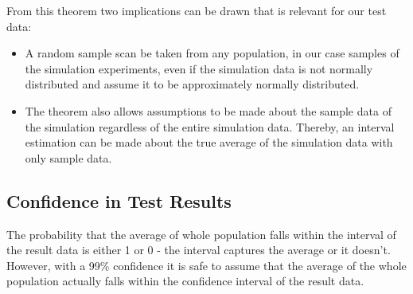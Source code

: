 \documentclass[a4paper,11pt]{kth-mag}
\begin{document}
From this theorem two implications can be drawn that is relevant for our test data:
\begin{itemize}
\item A random sample scan be taken from any population, in our case samples of the simulation experiments, even if the simulation data is not normally distributed and assume it to be approximately normally distributed.

\item The theorem also allows assumptions to be made about the sample data of the simulation regardless of the entire simulation data. Thereby, an interval estimation can be made about the true average of the simulation data with only sample data.
\end{itemize}

 \subsection{Confidence in Test Results}
The probability that the average of whole population falls within the interval of the result data is either 1 or 0 - the interval captures the average or it doesn't\cite{gunnar}. However, with a 99\% confidence it is safe to assume that the average of the whole population actually falls within the confidence interval of the result data. 


\begin{comment}
\begin{figure}[ht] 
\begin{center}
And here is a figure 
\caption{\small{Several statements describing the same resource.}}\label{RDF_4}
\end{center}
\end{figure}


that we refer to here: \ref{RDF_4}
\end{comment}
\printbibliography
\end{document}
